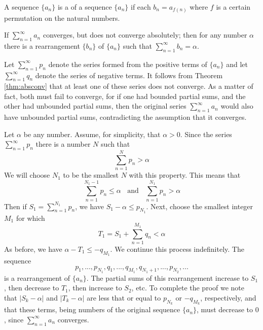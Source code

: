 \documentclass[12pt]{report}
\begin{document}
\begin{defn}{}{}
    A sequence $\{a_n\}$ is a  of a sequence $\{a_n\}$ if each $b_n = a_{f(n)}$ where $f$ is a certain permutation on the natural numbers.
\end{defn}



\begin{thm}{}{}
    If $\sum\limits_{n=1}^{\infty}a_n$ converges, but does not converge absolutely; then for any number $\alpha$ there is a rearrangement $\{b_n\}$ of $\{a_n\}$ such that $\sum\limits_{n=1}^{\infty}b_n = \alpha$.
\end{thm}
\begin{proof*}{}{}
    Let $\sum\limits_{n=1}^{\infty}p_n$ denote the series formed from the positive terms of $\{a_n\}$ and let $\sum\limits_{n=1}^{\infty}q_n$ denote the series of negative terms. It follows from Theorem \ref{thm:absconv} that at least one of these series does not converge. As a matter of fact, both must fail to converge, for if one had bounded partial sums, and the other had unbounded partial sums, then the original series $\sum\limits_{n=1}^{\infty}a_n$ would also have unbounded partial sums, contradicting the assumption that it converges.

    Let $\alpha$ be any number. Assume, for simplicity, that $\alpha > 0$. Since the series $\sum\limits_{n=1}^{\infty}p_n$ there is a number $N$ such that \begin{equation*}
        \sum\limits_{n=1}^Np_n > \alpha
    \end{equation*}
    We will choose $N_1$ to be the smallest $N$ with this property. This means that \begin{equation*}
        \sum\limits_{n=1}^{N_1-1}p_n \leq \alpha\;\;\text{ and }\;\;\sum\limits_{n=1}^{N_1}p_n > \alpha
    \end{equation*}
    Then if $S_1 = \sum\limits_{n=1}^{N_1}p_n$, we have $S_1 - \alpha \leq p_{N_1}$. Next, choose the smallest integer $M_1$ for which \begin{equation*}
        T_1 = S_1 + \sum\limits_{n=1}^{M_1}q_n < \alpha
    \end{equation*}
    As before, we have $\alpha - T_1 \leq -q_{M_1}$. We continue this process indefinitely. The sequence \begin{equation*}
        p_1,...,p_{N_1},q_1,...,q_{M_1},q_{N_1+1},...,p_{N_2},...
    \end{equation*}
    is a rearrangement of $\{a_n\}$. The partial sums of this rearrangement increase to $S_1$, then decrease to $T_1$, then increase to $S_2$, etc. To complete the proof we note that $|S_k -\alpha|$ and $|T_k - \alpha|$ are less that or equal to $p_{N_k}$ or $-q_{M_k}$, respectively, and that these terms, being numbers of the original sequence $\{a_n\}$, must decrease to $0$, since $\sum\limits_{n=1}^{\infty}a_n$ converges.
\end{proof*}
\end{document}

